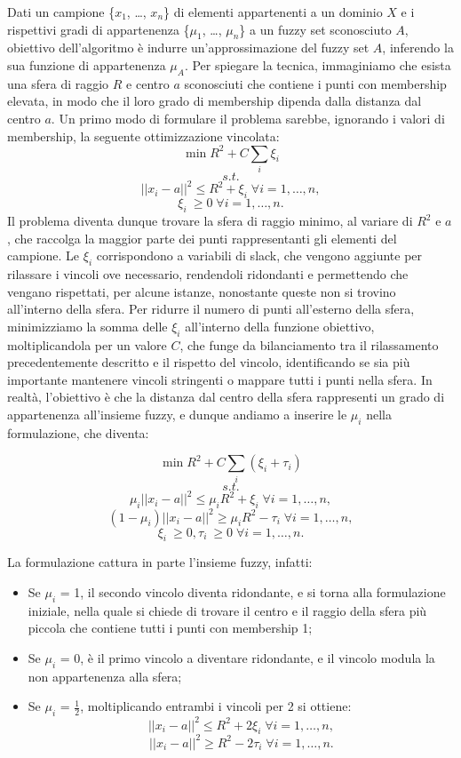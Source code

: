 \documentclass[12pt,a4paper]{report}
\begin{document}
Dati un campione  \{$x_1$, \dots , $x_n$\} di elementi appartenenti a un dominio $X$ e i rispettivi gradi di appartenenza  \{$\mu_1$, \dots , $\mu_n$\}  a un fuzzy set sconosciuto $A$, obiettivo dell'algoritmo è indurre un'approssimazione del fuzzy set $A$,  inferendo la sua funzione di appartenenza $\mu_A$. Per spiegare la tecnica, immaginiamo che esista una sfera di raggio $R$  e centro $a$ sconosciuti che contiene i punti con membership elevata, in modo che il loro  grado di membership dipenda dalla distanza dal centro $a$.
Un primo modo di formulare il problema sarebbe, ignorando i valori di membership, la seguente ottimizzazione vincolata:
\[ \min R^2 + C\sum_{i} \xi_{i}\]
\[s.t.\]
\[||x_i - a||^2  \leq R^2 + \xi_{i} \; \forall i = 1, \dots, n,\]
\[ \xi_{i}\ \geq 0 \; \forall i = 1, \dots, n.\]
Il problema diventa dunque trovare la sfera di raggio minimo, al variare di $R^2$ e $a$, che raccolga la maggior parte dei punti rappresentanti gli elementi del campione.  
Le $\xi_i$ corrispondono a variabili di slack, che vengono aggiunte per rilassare i vincoli ove necessario, rendendoli ridondanti e permettendo che vengano rispettati, per alcune istanze, nonostante queste non si trovino all'interno della sfera. Per ridurre il numero di punti all'esterno della sfera, minimizziamo la somma delle $\xi_i$ all'interno della funzione obiettivo, moltiplicandola per un valore $C$, che funge da bilanciamento tra il rilassamento precedentemente descritto e il rispetto del vincolo, identificando se sia più importante mantenere vincoli stringenti o mappare tutti i punti nella sfera.
In realtà, l'obiettivo è che la distanza dal centro della sfera rappresenti un grado di appartenenza all'insieme fuzzy, e dunque andiamo a inserire le $\mu_i$ nella formulazione, che diventa:

\[\min R^2 + C\sum_{i} (\xi_{i} + \tau_{i})\]
\[s.t.\]
\[ \mu_i||x_i - a||^2  \leq \mu_i R^2 + \xi_{i} \; \forall i = 1, \dots, n,\]
\[ (1 - \mu_i)||x_i - a||^2  \geq \mu_i R^2 - \tau_{i}  \; \forall i = 1, \dots, n,\]
\[ \xi_{i}\ \geq 0, \tau_{i}\ \geq 0  \; \forall i = 1, \dots, n.\]

La formulazione cattura in parte l'insieme fuzzy, infatti:
\begin{itemize}
  \item Se  $\mu_i$ = 1, il secondo vincolo diventa ridondante, e si torna alla formulazione iniziale, nella quale si chiede di trovare il centro  e il raggio della sfera più piccola che contiene tutti i punti con membership 1;
  \item Se   $\mu_i$ = 0, è il primo vincolo a diventare ridondante, e il vincolo modula la non appartenenza alla sfera;		
  \item Se   $\mu_i$ = $\frac{1}{2}$, moltiplicando entrambi i vincoli per 2 si ottiene:
\[ ||x_i - a||^2  \leq R^2 + 2\xi_{i} \; \forall i = 1, \dots, n,\]
\[ ||x_i - a||^2  \geq R^2 - 2\tau_{i}\; \forall i = 1, \dots, n.\]
\end{itemize}
\end{document}
